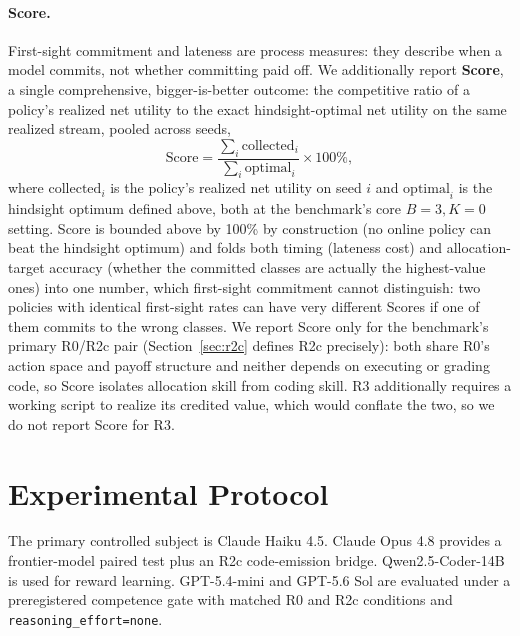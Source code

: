 \documentclass{article}
\begin{document}
\paragraph{Score.} First-sight commitment and lateness are process measures:
they describe when a model commits, not whether committing paid off. We
additionally report \textbf{Score}, a single comprehensive, bigger-is-better
outcome: the competitive ratio of a policy's realized net utility to the exact
hindsight-optimal net utility on the same realized stream, pooled across seeds,
\[
\text{Score} = \frac{\sum_i \text{collected}_i}{\sum_i \text{optimal}_i}
\times 100\%,
\]
where $\text{collected}_i$ is the policy's realized net utility on seed $i$ and
$\text{optimal}_i$ is the hindsight optimum defined above, both at the
benchmark's core $B=3,K=0$ setting. Score is bounded above by 100\% by
construction (no online policy can beat the hindsight optimum) and folds both
timing (lateness cost) and allocation-target accuracy (whether the committed
classes are actually the highest-value ones) into one number, which first-sight
commitment cannot distinguish: two policies with identical first-sight rates
can have very different Scores if one of them commits to the wrong classes.
We report Score only for the benchmark's primary R0/R2c pair (Section~\ref{sec:r2c}
defines R2c precisely): both share R0's action space and payoff structure and
neither depends on executing or grading code, so Score isolates allocation
skill from coding skill. R3 additionally requires a working script to realize
its credited value, which would conflate the two, so we do not report Score
for R3.

\section{Experimental Protocol}

The primary controlled subject is Claude Haiku 4.5. Claude Opus 4.8 provides a
frontier-model paired test plus an R2c code-emission bridge. Qwen2.5-Coder-14B
is used for reward learning.
GPT-5.4-mini and GPT-5.6 Sol are evaluated under a preregistered competence gate
with matched R0 and R2c conditions and \texttt{reasoning\_effort=none}.
\end{document}
